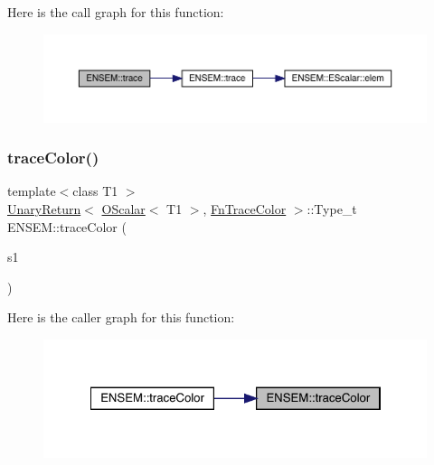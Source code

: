 Here is the call graph for this function\+:\nopagebreak
\begin{figure}[H]
\begin{center}
\leavevmode
\includegraphics[width=350pt]{d1/d71/group__obsscalar_ga86ed3e3adf57442824b4275e5ea2a3fd_cgraph}
\end{center}
\end{figure}
\mbox{\label{group__obsscalar_ga6c49507babe850f36f0765318257dc08}} 
\subsubsection{\texorpdfstring{traceColor()}{traceColor()}}
{\footnotesize\ttfamily template$<$class T1 $>$ \\
\mbox{\hyperlink{structENSEM_1_1UnaryReturn}{Unary\+Return}}$<$ \mbox{\hyperlink{classENSEM_1_1OScalar}{O\+Scalar}}$<$ T1 $>$, \mbox{\hyperlink{structENSEM_1_1FnTraceColor}{Fn\+Trace\+Color}} $>$\+::Type\+\_\+t E\+N\+S\+E\+M\+::trace\+Color (\begin{DoxyParamCaption}\item[{const \mbox{\hyperlink{classENSEM_1_1OScalar}{O\+Scalar}}$<$ T1 $>$ \&}]{s1 }\end{DoxyParamCaption})\hspace{0.3cm}{\ttfamily [inline]}}

Here is the caller graph for this function\+:\nopagebreak
\begin{figure}[H]
\begin{center}
\leavevmode
\includegraphics[width=322pt]{d1/d71/group__obsscalar_ga6c49507babe850f36f0765318257dc08_icgraph}
\end{center}
\end{figure}
\mbox{\label{group__obsscalar_gabe14ff90818892f233905fa6dad8eb49}} 
